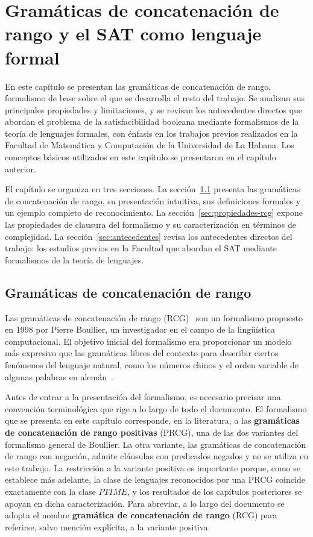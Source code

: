 \documentclass{report}
\theoremstyle{definition}
\theoremstyle{plain}
\theoremstyle{remark}
\begin{document}
\setcounter{chapter}{1}
\chapter{Gramáticas de concatenación de rango y el SAT como lenguaje formal}
\label{cap:rcg-sat}

En este capítulo se presentan las gramáticas de concatenación de rango,
formalismo de base sobre el que se desarrolla el resto del trabajo. Se
analizan sus principales propiedades y limitaciones, y se revisan los
antecedentes directos que abordan el problema de la satisfacibilidad
booleana mediante formalismos de la teoría de lenguajes formales, con
énfasis en los trabajos previos realizados en la Facultad de Matemática
y Computación de la Universidad de La Habana. Los conceptos básicos
utilizados en este capítulo se presentaron en el capítulo anterior.

El capítulo se organiza en tres secciones. La sección~\ref{sec:rcg}
presenta las gramáticas de concatenación de rango, su presentación
intuitiva, sus definiciones formales y un ejemplo completo de
reconocimiento. La sección~\ref{sec:propiedades-rcg} expone las
propiedades de clausura del formalismo y su caracterización en
términos de complejidad. La sección~\ref{sec:antecedentes} revisa los
antecedentes directos del trabajo: los estudios previos en la Facultad
que abordan el SAT mediante formalismos de la teoría de lenguajes.

\section{Gramáticas de concatenación de rango}
\label{sec:rcg}

Las gramáticas de concatenación de rango (RCG)~\cite{boullier1998proposal}
son un formalismo propuesto en 1998 por Pierre Boullier, un investigador
en el campo de la lingüística computacional. El objetivo inicial del
formalismo era proporcionar un modelo más expresivo que las gramáticas
libres del contexto para describir ciertos fenómenos del lenguaje
natural, como los números chinos y el orden variable de algunas palabras
en alemán~\cite{boullier1999chinese}.

Antes de entrar a la presentación del formalismo, es necesario precisar
una convención terminológica que rige a lo largo de todo el documento.
El formalismo que se presenta en este capítulo corresponde, en la
literatura, a las \textbf{gramáticas de concatenación de rango
positivas} (PRCG), una de las dos variantes del formalismo general de
Boullier. La otra variante, las gramáticas de concatenación de rango con
negación, admite cláusulas con predicados negados y no se utiliza en
este trabajo. La restricción a la variante positiva es importante
porque, como se establece más adelante, la clase de lenguajes
reconocidos por una PRCG coincide exactamente con la clase $PTIME$, y
los resultados de los capítulos posteriores se apoyan en dicha
caracterización. Para abreviar, a lo largo del documento se adopta el
nombre \textbf{gramática de concatenación de rango} (RCG) para
referirse, salvo mención explícita, a la variante positiva.
\end{document}
